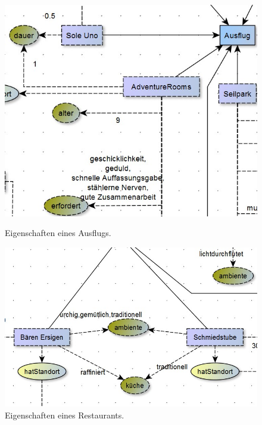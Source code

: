     \begin{figure}[H]%
        \begin{minipage}[hbt]{0,49\textwidth}
            \centering
            \includegraphics[scale=0.3]{bilder/charAusflug.jpg}
            \caption*{Eigenschaften eines Ausflugs.\label{fig:charAusflug}\protect\footnotemark}
        \end{minipage}
        \begin{minipage}[hbt]{0,49\textwidth}
            \centering
            \includegraphics[scale=0.3]{bilder/charRestaurant.jpg}
            \caption*{Eigenschaften eines Restaurants.\label{fig:charRest}\protect\footnotemark[1]}
        \end{minipage}
    \end{figure}

